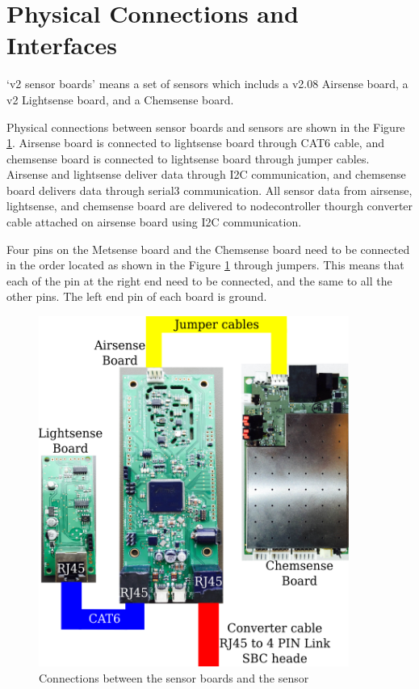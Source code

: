 \section{Physical Connections and Interfaces}

`v2 sensor boards' means a set of sensors which includs a v2.08 Airsense board, a v2 Lightsense board, and a Chemsense board.
\par
Physical connections between sensor boards and sensors are shown in the Figure \ref{fig:physicalConnections}. Airsense board is connected to lightsense board through CAT6 cable, and chemsense board is connected to lightsense board through jumper cables. Airsense and lightsense deliver data through I2C communication, and chemsense board delivers data through serial3 communication. All sensor data from airsense, lightsense, and chemsense board are delivered to nodecontroller thourgh converter cable attached on airsense board using I2C communication.
\par
Four pins on the Metsense board and the Chemsense board need to be connected in the order located as shown in the Figure \ref{fig:physicalConnections} through jumpers. This means that each of the pin at the right end need to be connected, and the same to all the other pins. The left end pin of each board is ground.
\\

\begin{figure}[h]
\begin{center}
\includegraphics[width=4in]{g4353.png}
\caption{Connections between the sensor boards and the sensor}
\label{fig:physicalConnections}
\end{center}
\end{figure}

